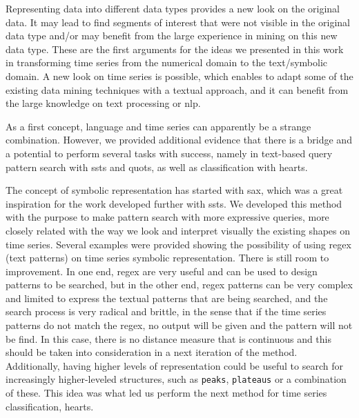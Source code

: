 Representing data into different data types provides a new look on the original data. It may lead to find segments of interest that were not visible in the original data type and/or may benefit from the large experience in mining on this new data type. These are the first arguments for the ideas we presented in this work in transforming time series from the numerical domain to the text/symbolic domain. A new look on time series is possible, which enables to adapt some of the existing data mining techniques with a textual approach, and it can benefit from the large knowledge on text processing or \gls{nlp}.
\par
As a first concept, language and time series can apparently be a strange combination. However, we provided additional evidence that there is a bridge and a potential to perform several tasks with success, namely in text-based query pattern search with \gls{ssts} and \gls{quots}, as well as classification with \gls{hearts}. 
\par
The concept of symbolic representation has started with \gls{sax}, which was a great inspiration for the work developed further with \gls{ssts}. We developed this method with the purpose to make pattern search with more expressive queries, more closely related with the way we look and interpret visually the existing shapes on time series. Several examples were provided showing the possibility of using \gls{regex} (text patterns) on time series symbolic representation. There is still room to improvement. In one end, \gls{regex} are very useful and can be used to design patterns to be searched, but in the other end, \gls{regex} patterns can be very complex and limited to express the textual patterns that are being searched, and the search process is very radical and brittle, in the sense that if the time series patterns do not match the \gls{regex}, no output will be given and the pattern will not be find. In this case, there is no distance measure that is continuous and this should be taken into consideration in a next iteration of the method. Additionally, having higher levels of representation could be useful to search for increasingly higher-leveled structures, such as \texttt{peaks}, \texttt{plateaus} or a combination of these. This idea was what led us perform the next method for time series classification, \gls{hearts}. 
\par
